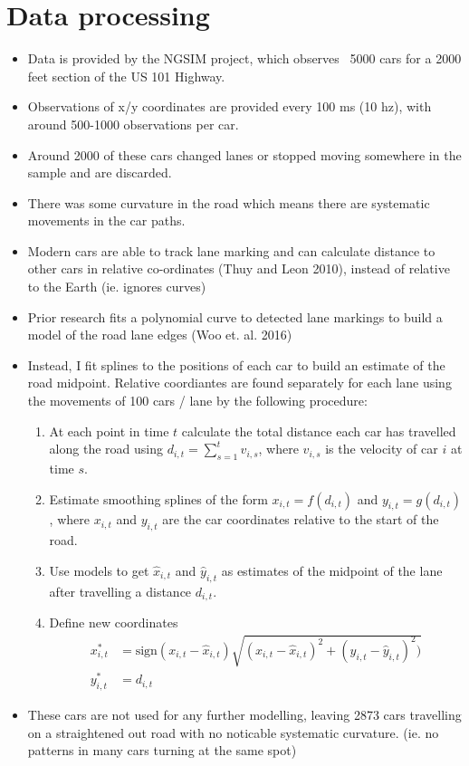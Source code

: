 \documentclass[12pt,a4paper]{article}\usepackage[]{graphicx}\usepackage[]{color}
\begin{document}
\section{Data processing}

\begin{itemize}
\item Data is provided by the NGSIM project, which observes ~5000 cars for a 2000 feet section of the US 101 Highway.
\item Observations of x/y coordinates are provided every 100 ms (10 hz), with around 500-1000 observations per car.
\item Around 2000 of these cars changed lanes or stopped moving somewhere in the sample and are discarded.
\item There was some curvature in the road which means there are systematic movements in the car paths.
\item Modern cars are able to track lane marking and can calculate distance to other cars in relative co-ordinates (Thuy and Leon 2010), instead of relative to the Earth (ie. ignores curves)
\item Prior research fits a polynomial curve to detected lane markings to build a model of the road lane edges (Woo et. al. 2016) 
\item Instead, I fit splines to the positions of each car to build an estimate of the road midpoint. Relative coordiantes are found separately for each lane using the movements of 100 cars / lane by the following procedure:
\begin{enumerate}
\item At each point in time $t$ calculate the total distance each car has travelled along the road using $d_{i, t} = \sum_{s=1}^t v_{i, s}$, where $v_{i, s}$ is the velocity of car $i$ at time $s$. 
\item Estimate smoothing splines of the form $x_{i, t} = f(d_{i, t})$ and $y_{i, t} = g(d_{i, t})$, where $x_{i, t}$ and $y_{i, t}$ are the car coordinates relative to the start of the road.
\item Use models to get $\hat{x}_{i, t}$ and $\hat{y}_{i, t}$ as estimates of the midpoint of the lane after travelling a distance $d_{i, t}$.
\item Define new coordinates 
\begin{align}
x^*_{i, t} &= \mbox{sign}(x_{i, t} - \hat{x}_{i, t})\sqrt{(x_{i, t}-\hat{x}_{i, t})^2 + (y_{i, t} - \hat{y}_{i, t})^2)} \label{xRel} \\
y^*_{i, t} &= d_{i, t} \label{yRel}
\end{align}
\end{enumerate}
\item These cars are not used for any further modelling, leaving 2873 cars travelling on a straightened out road with no noticable systematic curvature. (ie. no patterns in many cars turning at the same spot)
\end{itemize}
\end{document}
